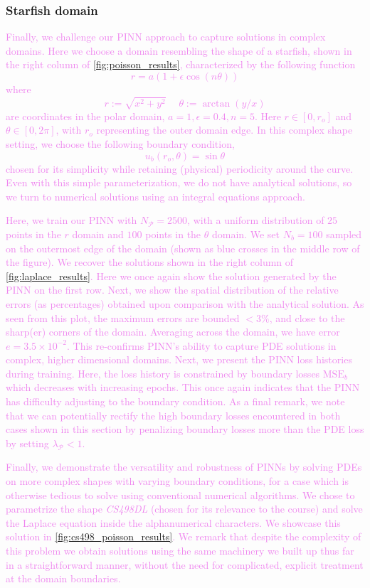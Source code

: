 \documentclass[11pt]{article}
\newcommand{\mse}{\textrm{MSE}}
\newcommand{\pde}{\ensuremath{\mathcal{P}}}
\newcommand{\newcontent}[1]{\textcolor{violet}{#1}}
\begin{document}
\subsubsection{Starfish domain}
\label{sec:orgd4bff2b}
\newcontent{
Finally, we challenge our PINN approach to capture solutions in complex
domains. Here we choose a domain resembling the shape of a starfish, shown
in the right column of \cref{fig:poisson_results},
characterized by the following function
\[ r = a \left( 1 + \epsilon \cos{\left( n \theta \right)} \right) \]
where
\[ r := \sqrt{x^2 + y^2} \; \quad \theta := \arctan{\left(y/x\right)} \]
are coordinates in the polar domain, \(a = 1, \epsilon = 0.4 , n = 5\). Here
\(r \in [0, r_o]\) and \(\theta \in [0, 2\pi]\), with \(r_o\)
representing the outer domain edge. In this complex shape setting, we
choose the following boundary condition,
\[ u_b(r_o, \theta) = \sin{\theta}\]
chosen for its simplicity while retaining (physical) periodicity around the curve.
Even with this simple parameterization, we do not have
analytical solutions, so we turn
to numerical solutions using an integral equations approach.
}

\newcontent{
Here, we train our PINN with \(N_\pde = 2500\), with a uniform
distribution of \(25\) points in the \(r\) domain and \(100\) points in
the \(\theta\) domain. We set \(N_b = 100\) sampled on the outermost
edge of the domain (shown as blue crosses in the middle row of the figure).
We recover the solutions shown in the right column of
\cref{fig:laplace_results}. Here we once again show the
solution generated by the PINN on the first row. Next, we show the spatial
distribution of the relative errors (as percentages) obtained upon
comparison with the analytical solution. As
seen from this plot, the maximum errors are bounded \(< 3\%\), and close to
the sharp(er) corners of the domain. Averaging across the domain, we have error \(e = 3.5 \times 10^{-2}\).
This re-confirms PINN's ability to capture PDE
solutions in complex, higher dimensional domains. Next, we present the PINN loss histories
during training.
Here, the loss history is constrained by boundary losses \(\mse_{b}\)
which decreases with increasing epochs. This once again indicates that the
PINN has difficulty adjusting to the boundary condition. As a final remark,
we note that we can potentially rectify the high boundary losses encountered in both cases
shown in this section by penalizing boundary losses more than the PDE loss
by setting \(\lambda_{\pde} < 1\).
}

\newcontent{
Finally, we demonstrate the versatility and robustness of PINNs by solving
PDEs on more complex shapes with varying boundary conditions, for a case
which is otherwise tedious to solve using conventional numerical algorithms.
We chose to parametrize the shape \emph{CS498DL} (chosen for its
relevance to the course) and solve the Laplace equation inside the
alphanumerical characters. We showcase this solution in
\cref{fig:cs498_poisson_results}. We remark that despite the complexity of this
problem we obtain solutions using the same machinery we built up thus far in a
straightforward manner, without the need for complicated, explicit treatment
at the domain boundaries.
}
\end{document}
